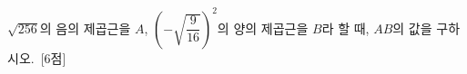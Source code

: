 $\sqrt{256}$의 음의 제곱근을 $A$, $\left(-\sqrt{\dfrac{9}{16}}\right)^2$의 양의 제곱근을 $B$라 할 때, $AB$의 값을 구하시오.~\mbox{\mbox{[6점]}}
